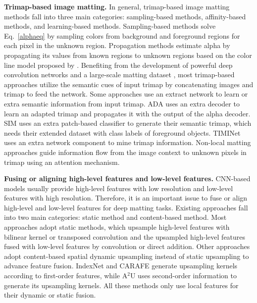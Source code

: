 \documentclass[10pt,twocolumn,letterpaper]{article}
\begin{document}
\textbf{Trimap-based image matting.} In general, trimap-based image matting methods fall into three main categories: sampling-based methods, affinity-based methods, and learning-based methods. Sampling-based methods \cite{bayes_12,cluster_14,global_18,alpha_36} solve Eq.~\ref{alphaeq} by sampling colors from background and foreground regions for each pixel in the unknown region. Propagation methods \cite{knn_10,random_17,closed_24,spectral_25} estimate alpha by propagating its values from known regions to unknown regions based on the color line model proposed by \cite{closed_24}. Benefiting from the development of powerful deep convolution networks and a large-scale matting dataset \cite{deepmatting}, most trimap-based approaches \cite{deepmatting,indexnet,context,fba,pii,lfpnet} utilize the semantic cues of input trimap by concatenating images and trimap to feed the network. Some approaches use an extract network to learn or extra semantic information from input trimap. ADA \cite{adamatting} uses an extra decoder to learn an adapted trimap and propagates it with the output of the alpha decoder. SIM \cite{sim} uses an extra patch-based classifier to generate their semantic trimap, which needs their extended dataset with class labels of foreground objects. TIMINet \cite{timinet} uses an extra network component to mine trimap information. Non-local matting approaches \cite{gca,hdmatt}  guide information flow from the image context to unknown pixels in trimap using an attention mechanism.

\textbf{Fusing or aligning high-level features and low-level features.} CNN-based models usually provide high-level features with low resolution and low-level features with high resolution. Therefore, it is an important issue to fuse or align high-level and low-level features for deep matting tasks. Existing approaches fall into two main categories: static method and content-based method. Most approaches \cite{deepmatting,fba,gca,lfpnet} adopt static methods, which upsample high-level features with bilinear kernel or transposed convolution and the upsampled high-level features fused with low-level features by convolution or direct addition. Other approaches \cite{indexnet,carafe,a2u} adopt content-based spatial dynamic upsampling  instead of static upsampling to advance feature fusion. IndexNet \cite{indexnet} and CARAFE \cite{carafe} generate upsampling kernels according to  first-order features, while A$^2$U \cite{a2u} uses second-order information to generate its upsampling kernels. All these methods only use local features for their dynamic or static fusion.
\end{document}
